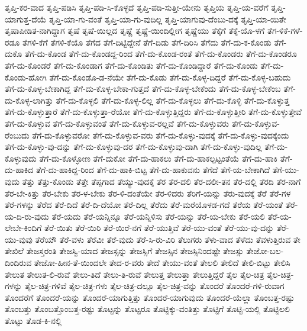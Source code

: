 {ತೃಪ್ತಿ-ಕರ-ವಾದ
ತೃಪ್ತಿ-ಪಡಿಸಿ
ತೃಪ್ತಿ-ಪಡಿ-ಸಿ-ಕೊಳ್ಳದೆ
ತೃಪ್ತಿ-ಪಡಿ-ಸುತ್ತೀ-ಯೇನು
ತೃಪ್ತಿಯ
ತೃಪ್ತಿ-ಯ-ವರೆಗೆ
ತೃಪ್ತಿ-ಯಾಗುತ್ತ-ದೆಯೆ
ತೃಪ್ತಿ-ಯಾ-ಗು-ವಂತೆ
ತೃಪ್ತಿ-ಯಾ-ಗು-ವುದಿಲ್ಲ
ತೃಪ್ತಿ-ಯಾಗುವು-ದೆಂಬು-ದಕ್ಕೆ
ತೃಪ್ತಿ-ಯಾ-ಯಿತೇ
ತೃಷಾಪೀಡಿತ-ನಾಗಿದ್ದಾಗ
ತೃಷೆ
ತೃಷೆ-ಯಿಲ್ಲದ
ತೃಷ್ಣೆ
ತೃಷ್ಣೆ-ಯಿಂದಿಲ್ಲೀಗ
ತೃಷ್ಣೆಯು
ತೆಕ್ಕೆಗೆ
ತೆಕ್ಕೆ-ಯೊ-ಳಗೆ
ತೆಗ-ಳಿಕೆ-ಗಳೆ-ರಡೂ
ತೆಗಳಿ-ಕೆಗೆ
ತೆಗಳಿ-ಕೆಯೊ
ತೆಗೆದ
ತೆಗೆ-ದಿಟ್ಟಿದ್ದೇನೆ
ತೆಗೆ-ದಿಡು
ತೆಗೆ-ದಿರಿಸಿ
ತೆಗೆದು
ತೆಗೆ-ದು-ಕ-ಕೊಂಡು
ತೆಗೆ-ದುಕೊ
ತೆಗೆ-ದು-ಕೊಂಡ
ತೆಗೆ-ದು-ಕೊಂಡದ್ದ-ರಿಂದ
ತೆಗೆ-ದು-ಕೊಂಡ-ರಂತೆ
ತೆಗೆ-ದು-ಕೊಂಡರು
ತೆಗೆ-ದು-ಕೊಂಡರೂ
ತೆಗೆ-ದು-ಕೊಂಡರೆ
ತೆಗೆ-ದು-ಕೊಂಡಾಗ
ತೆಗೆ-ದು-ಕೊಂಡಿತು
ತೆಗೆ-ದು-ಕೊಂಡಿದ್ದಾರೆ
ತೆಗೆ-ದು-ಕೊಂಡು
ತೆಗೆ-ದು-ಕೊಂಡು-ಹೋಗಿ
ತೆಗೆ-ದು-ಕೊಂಡೊ-ಡ-ನೆಯೇ
ತೆಗೆ-ದು-ಕೊಡು
ತೆಗೆ-ದು-ಕೊಳ್ಳ-ದಿದ್ದರೆ
ತೆಗೆ-ದು-ಕೊಳ್ಳ-ಬಹುದು
ತೆಗೆ-ದು-ಕೊಳ್ಳ-ಬೇಕಾಗಿದ್ದ
ತೆಗೆ-ದು-ಕೊಳ್ಳ-ಬೇಕಾ-ಗುತ್ತದೆ
ತೆಗೆ-ದು-ಕೊಳ್ಳ-ಬೇಕೆಂದು
ತೆಗೆ-ದು-ಕೊಳ್ಳ-ಬೇಕೆಂಬ
ತೆಗೆ-ದು-ಕೊಳ್ಳ-ಲಾಗಿತ್ತು
ತೆಗೆ-ದು-ಕೊಳ್ಳಲಿ
ತೆಗೆ-ದು-ಕೊಳ್ಳ-ಲಿಲ್ಲ
ತೆಗೆ-ದು-ಕೊಳ್ಳಲು
ತೆಗೆ-ದು-ಕೊಳ್ಳಿ
ತೆಗೆ-ದು-ಕೊಳ್ಳುತ್ತ
ತೆಗೆ-ದು-ಕೊಳ್ಳುತ್ತಾರೆ
ತೆಗೆ-ದು-ಕೊಳ್ಳುತ್ತಾ-ರೆಯೋ
ತೆಗೆ-ದು-ಕೊಳ್ಳುತ್ತಿದ್ದರು
ತೆಗೆ-ದು-ಕೊಳ್ಳುತ್ತೀರಿ
ತೆಗೆ-ದು-ಕೊಳ್ಳುತ್ತೇವೆ
ತೆಗೆ-ದು-ಕೊಳ್ಳುವ
ತೆಗೆ-ದು-ಕೊಳ್ಳುವಂತೆ
ತೆಗೆ-ದು-ಕೊಳ್ಳುವ-ರಲ್ಲವೆ
ತೆಗೆ-ದು-ಕೊಳ್ಳುವರು
ತೆಗೆ-ದು-ಕೊಳ್ಳುವ-ರೆಂಬುದು
ತೆಗೆ-ದು-ಕೊಳ್ಳುವರೋ
ತೆಗೆ-ದು-ಕೊಳ್ಳುವ-ವರು
ತೆಗೆ-ದು-ಕೊಳ್ಳು-ವುದಕ್ಕೆ
ತೆಗೆ-ದು-ಕೊಳ್ಳು-ವುದಕ್ಕೆಂದು
ತೆಗೆ-ದು-ಕೊಳ್ಳು-ವು-ದನ್ನು
ತೆಗೆ-ದು-ಕೊಳ್ಳುವು-ದರ
ತೆಗೆ-ದು-ಕೊಳ್ಳುವು-ದಾಗಿ
ತೆಗೆ-ದು-ಕೊಳ್ಳು-ವುದಿಲ್ಲ
ತೆಗೆ-ದು-ಕೊಳ್ಳುವುದು
ತೆಗೆ-ದು-ಕೊಳ್ಳೋಣ
ತೆಗೆ-ದುಕೋ
ತೆಗೆ-ದು-ಹಾಕಲು
ತೆಗೆ-ದು-ಹಾಕಲ್ಪಟ್ಟಂತೆಯೆ
ತೆಗೆ-ದು-ಹಾಕಿ
ತೆಗೆ-ದು-ಹಾಕಿದ
ತೆಗೆ-ದು-ಹಾಕಿದ್ದ-ರಿಂದ
ತೆಗೆ-ದು-ಹಾಕಿ-ಬಿಟ್ಟ
ತೆಗೆ-ದು-ಹಾಕುವನು
ತೆಗೆದೆ
ತೆಗೆ-ಯ-ಬೇಕಾಗಿದೆ
ತೆಗೆ-ಯು-ವುದು
ತೆತ್ತು
ತೆತ್ತು-ಕೊಂಡು
ತೆತ್ತೇ
ತೆಪ್ಪಗಾದ
ತೆಯ್ಯು-ವುದಕ್ಕೆ
ತೆರ
ತೆರ-ದಲಿ
ತೆರ-ದಲೀ-ತನ
ತೆರ-ದಲ್ಲಿ
ತೆರದಿ
ತೆರ-ನಾಗೆ
ತೆರ-ಬೇ-ಕಿತ್ತು
ತೆರ-ಬೇಕು
ತೆರ-ಳ-ಬೇಕು
ತೆರ-ಳಿ-ದಂತೆಯೇ
ತೆರ-ಳಿದರು
ತೆರಿಗೆ-ಯನ್ನು
ತೆರು-ವುದಕ್ಕೆ
ತೆರೆ
ತೆರೆ-ಗಳ
ತೆರೆ-ಗಳನ್ನು
ತೆರೆದ
ತೆರೆ-ದಿದೆ
ತೆರೆ-ದಿ-ದೆಯೋ
ತೆರೆ-ದಿಲ್ಲ
ತೆರೆದು
ತೆರೆ-ಮರೆಯೊಳಡ-ಗದೆ
ತೆರೆಯ
ತೆರೆ-ಯಂತೆ
ತೆರೆ-ಯ-ದಿ-ರು-ವುದು
ತೆರೆ-ಯದು
ತೆರೆ-ಯನ್ನಿನ್ನೂ
ತೆರೆ-ಯನ್ನಿಳಿಸು
ತೆರೆ-ಯನ್ನು
ತೆರೆ-ಯ-ಬೇಕು
ತೆರೆ-ಯಲಿ
ತೆರೆ-ಯ-ಲೇಬೇ-ಕಿಂದಿಗೆ
ತೆರೆ-ಯಿತು
ತೆರೆ-ಯಿರಿ
ತೆರೆ-ಯಿರೆ-ನಗೆ
ತೆರೆ-ಯುತ್ತಿವೆ
ತೆರೆ-ಯು-ವಂತೆ
ತೆರೆ-ಯು-ವು-ದನ್ನು
ತೆರೆ-ಯು-ವುವು
ತೆರೆಯೌ
ತೆರೆ-ವಳು
ತೆರೆವೀ
ತೆರೆ-ವುದು
ತೆರೆ-ಸಿ-ರು-ವಿರಿ
ತೆಲುಗರು
ತೆಳು-ವಾದ
ತೆಳೆದು
ತೆವಳುತ್ತಿರುವ
ತೇ
ತೇಖಿಲೆ
ತೇಜಸ್ತರಂತಿ
ತೇಜಸ್ವಿ-ಯಾದ
ತೇಜಸ್ಸನ್ನು
ತೇಜಸ್ಸಿಗೆ
ತೇಜಸ್ಸಿನ
ತೇಜಸ್ಸಿನಿಂದಷ್ಟೇ
ತೇಜಸ್ಸು
ತೇಜೋ-ಬಲ-ದಿಂದಿರುವ
ತೇಜೋ-ಹೀನ-ತೆ-ಯಿಂದಲೇ
ತೇದ-ರ-ವರು
ತೇದೆ
ತೇಯು-ವಂತೆ
ತೇಲಲಿ
ತೇಲಿದೆ
ತೇಲಿ-ಬಿಟ್ಟು
ತೇಲಿಸಿ
ತೇಲುತ
ತೇಲುತ-ಲಿ-ರುವೆ
ತೇಲು-ತಿದೆ
ತೇಲು-ತಿ-ರುವೆ
ತೇಲುತ್ತ
ತೇಲುತ್ತಾ
ತೇಲುತ್ತಿದ್ದರೆ
ತೈಲ
ತೈಲ-ಚಿತ್ರ
ತೈಲ-ಚಿತ್ರ-ಗಳನ್ನು
ತೈಲ-ಚಿತ್ರ-ಗಳಿವೆ
ತೈಲ-ಚಿತ್ರ-ಗಳು
ತೈಲ-ಚಿತ್ರ-ದಲ್ಲೂ
ತೈಲ-ಚಿತ್ರ-ವನ್ನು
ತೊಂದರೆ
ತೊಂದರೆ-ಗಳಿ-ರುವಾಗ
ತೊಂದರೆಗೆ
ತೊಂದರೆ-ಯನ್ನು
ತೊಂದರೆ-ಯಾಗುತ್ತಿತ್ತು
ತೊಂದರೆ-ಯಾಗುವುದು
ತೊಂದರೆ-ಯೆಲ್ಲಾ
ತೊಂಬತ್ತ-ರಷ್ಟು
ತೊಂಬತ್ತು
ತೊಂಬತ್ತೊಂಬತ್ತ-ರಷ್ಟು
ತೊಟ್ಟನ್ನು
ತೊಟ್ಟರೂ
ತೊಟ್ಟಿಕ್ಕು-ವಂತಿತ್ತು
ತೊಟ್ಟಿಗೆ
ತೊಟ್ಟಿ-ಯಲ್ಲಿ
ತೊಟ್ಟಿಲಲಿ
ತೊಟ್ಟು
ತೊಡ-ಕಿ-ನಲ್ಲಿ
}
